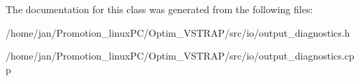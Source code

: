 The documentation for this class was generated from the following files\+:\begin{DoxyCompactItemize}
\item 
/home/jan/\+Promotion\+\_\+linux\+P\+C/\+Optim\+\_\+\+V\+S\+T\+R\+A\+P/src/io/output\+\_\+diagnostics.\+h\item 
/home/jan/\+Promotion\+\_\+linux\+P\+C/\+Optim\+\_\+\+V\+S\+T\+R\+A\+P/src/io/output\+\_\+diagnostics.\+cpp\end{DoxyCompactItemize}
